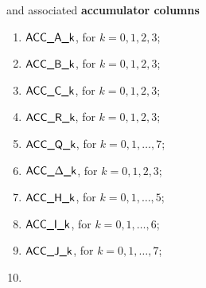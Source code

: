 \noindent and associated \textbf{accumulator columns}
\begin{multicols}{2}
\begin{enumerate}[resume]\setcounter{enumi}{\value{alu_ext_counter}}
	\item $\textsf{ACC}\textsf{\_A\_k}$,        for $k=0,1,2,3$;
	\item $\textsf{ACC}\textsf{\_B\_k}$,        for $k=0,1,2,3$;
	\item $\textsf{ACC}\textsf{\_C\_k}$,        for $k=0,1,2,3$;
	\item $\textsf{ACC}\textsf{\_R\_k}$,        for $k=0,1,2,3$;
	\item $\textsf{ACC}\textsf{\_Q\_k}$,        for $k=0,1,\dots,7$;
	\item $\textsf{ACC}\textsf{\_$\Delta$\_k}$, for $k=0,1,2,3$;
	\item $\textsf{ACC}\textsf{\_H\_k}$,        for $k=0,1,\dots,5$;
	\item $\textsf{ACC}\textsf{\_I\_k}$,        for $k=0,1,\dots,6$;
	\item $\textsf{ACC}\textsf{\_J\_k}$,        for $k=0,1,\dots,7$;
	\setcounter{alu_ext_counter}{\value{enumi}}
	\item[\vspace{\fill}]
\end{enumerate}
\end{multicols}

